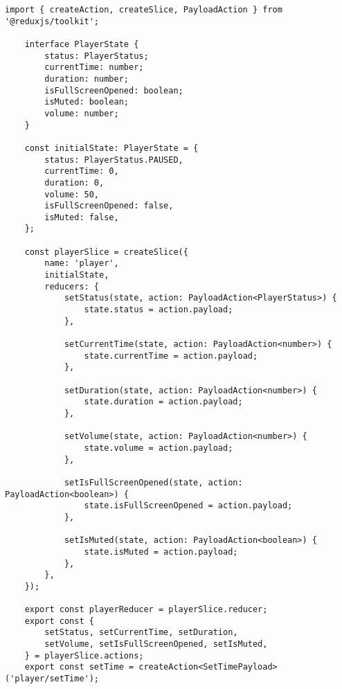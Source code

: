 \begin{lstlisting}[caption={player/slice.ts}]
	import { createAction, createSlice, PayloadAction } from '@reduxjs/toolkit';
	
	interface PlayerState {
		status: PlayerStatus;
		currentTime: number;
		duration: number;
		isFullScreenOpened: boolean;
		isMuted: boolean;
		volume: number;
	}
	
	const initialState: PlayerState = {
		status: PlayerStatus.PAUSED,
		currentTime: 0,
		duration: 0,
		volume: 50,
		isFullScreenOpened: false,
		isMuted: false,
	};
	
	const playerSlice = createSlice({
		name: 'player',
		initialState,
		reducers: {
			setStatus(state, action: PayloadAction<PlayerStatus>) {
				state.status = action.payload;
			},
			
			setCurrentTime(state, action: PayloadAction<number>) {
				state.currentTime = action.payload;
			},
			
			setDuration(state, action: PayloadAction<number>) {
				state.duration = action.payload;
			},
			
			setVolume(state, action: PayloadAction<number>) {
				state.volume = action.payload;
			},
			
			setIsFullScreenOpened(state, action: PayloadAction<boolean>) {
				state.isFullScreenOpened = action.payload;
			},
			
			setIsMuted(state, action: PayloadAction<boolean>) {
				state.isMuted = action.payload;
			},
		},
	});
	
	export const playerReducer = playerSlice.reducer;
	export const {
		setStatus, setCurrentTime, setDuration,
		setVolume, setIsFullScreenOpened, setIsMuted,
	} = playerSlice.actions;
	export const setTime = createAction<SetTimePayload>('player/setTime');
\end{lstlisting}

